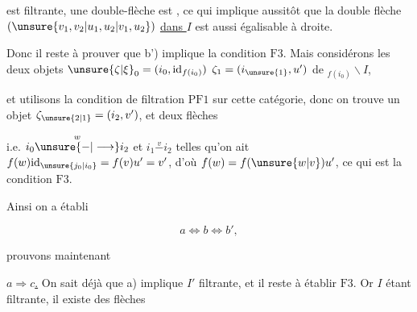 
est filtrante, une  double-flèche est  , ce qui implique aussitôt que la double flèche $(\unsure{v_1,v_2|u_1,u_2|v_1,u_2})$ \uline{dans $I$} est aussi égalisable à droite.

Donc il reste à prouver que b') implique la condition $\mathrm{F}3$. Mais considérons les deux objets $\unsure{\zeta|\xi}_0=(i_0,\mathrm{id}_{f(i_0)})$ $\zeta_1=(i_{\unsure{1}},u')$ de $ {}_{f(i_0)}\backslash I$,


et utilisons la condition de filtration $\mathrm{PF}1$ sur cette catégorie, donc on trouve un objet $\zeta_{\unsure{2|1}}=(i_2,v')$, et deux flèches 


i.e. $i_0\overset{w}{\unsure{\mathbin{-}|\longrightarrow}}i_2$ et $i_1\overset{v}{\mathbin{-}}i_2$ telles qu'on ait $f(w)\mathrm{id}_{\unsure{j_0|i_0}}=f(v)u'=v'$, d'où $f(w)=f(\unsure{w|v})u'$, ce qui est la condition $\mathrm{F}3$.

 Ainsi on a établi

\[a\Leftrightarrow b\Leftrightarrow b',\]

prouvons maintenant

\uline{$a\Rightarrow c$.} On sait déjà que a) implique $I'$ filtrante, et il reste à établir $\mathrm{F}3$.  Or $I$ étant filtrante, il existe  des flèches



